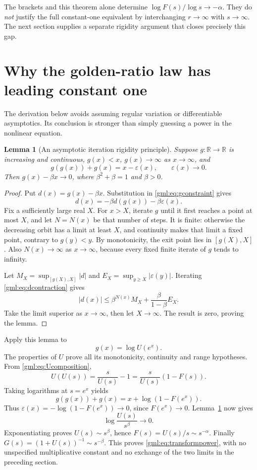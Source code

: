 \documentclass[11pt]{article}
\numberwithin{equation}{section}
\newtheorem{lemma}[theorem]{Lemma}
\theoremstyle{definition}
\theoremstyle{remark}
\newcommand{\R}{\mathbb R}
\newcommand{\eps}{\varepsilon}
\begin{document}
The brackets and this theorem alone determine
$\log F(s)/\log s\to-\alpha$. They do \emph{not} justify the full
constant-one equivalent by interchanging $r\to\infty$ with
$s\to\infty$. The next section supplies a separate rigidity argument
that closes precisely this gap.

\section{Why the golden-ratio law has leading constant one}\label{gml:sec:golden}
The derivation below avoids assuming regular variation or differentiable
asymptotics. Its conclusion is stronger than simply guessing a power in
the nonlinear equation.

\begin{lemma}[An asymptotic iteration rigidity principle]\label{gml:lem:rigidity}
Suppose $g:\R\to\R$ is increasing and continuous, $g(x)<x$,
$g(x)\to\infty$ as $x\to\infty$, and
\begin{equation}\label{gml:eq:gconstraint}
 g(g(x))+g(x)=x-\eps(x),\qquad \eps(x)\to0.
\end{equation}
Then $g(x)-\beta x\to0$, where $\beta^2+\beta=1$ and $\beta>0$.
\end{lemma}
\begin{proof}
Put $d(x)=g(x)-\beta x$. Substitution in \eqref{gml:eq:gconstraint} gives
\begin{equation}\label{gml:eq:dcontraction}
 d(x)=-\beta d(g(x))-\beta\eps(x).
\end{equation}
Fix a sufficiently large real $X$. For $x>X$, iterate $g$ until it first
reaches a point at most $X$, and let $N=N(x)$ be that number of steps.
It is finite: otherwise the decreasing orbit has a limit at least $X$,
and continuity makes that limit a fixed point, contrary to $g(y)<y$.
By monotonicity, the exit point lies in $[g(X),X]$. Also $N(x)\to\infty$
as $x\to\infty$, because every fixed finite iterate of $g$ tends to infinity.

Let $M_X=\sup_{[g(X),X]}|d|$ and
$E_X=\sup_{y\ge X}|\eps(y)|$. Iterating \eqref{gml:eq:dcontraction} gives
\[
 |d(x)|\le\beta^{N(x)}M_X+
           \frac{\beta}{1-\beta}E_X.
\]
Take the limit superior as $x\to\infty$, then let $X\to\infty$.
The result is zero, proving the lemma.
\end{proof}

Apply this lemma to
\begin{equation}\label{gml:eq:gdef}
 g(x)=\log U(e^x).
\end{equation}
The properties of $U$ prove all its monotonicity, continuity and range
hypotheses. From \eqref{gml:eq:Ucomposition},
\[
 U(U(s))=\frac{s}{U(s)}-1
        =\frac{s}{U(s)}(1-F(s)).
\]
Taking logarithms at $s=e^x$ yields
\[
 g(g(x))+g(x)=x+\log(1-F(e^x)).
\]
Thus $\eps(x)=-\log(1-F(e^x))\to0$, since $F(e^x)\to0$.
Lemma~\ref{gml:lem:rigidity} now gives
\[
 \log\frac{U(s)}{s^\beta}\longrightarrow0.
\]
Exponentiating proves $U(s)\sim s^\beta$, hence
$F(s)=U(s)/s\sim s^{-\alpha}$. Finally
$G(s)=(1+U(s))^{-1}\sim s^{-\beta}$.
This proves \eqref{gml:eq:transformpower}, with no unspecified multiplicative
constant and no exchange of the two limits in the preceding section.
\end{document}
